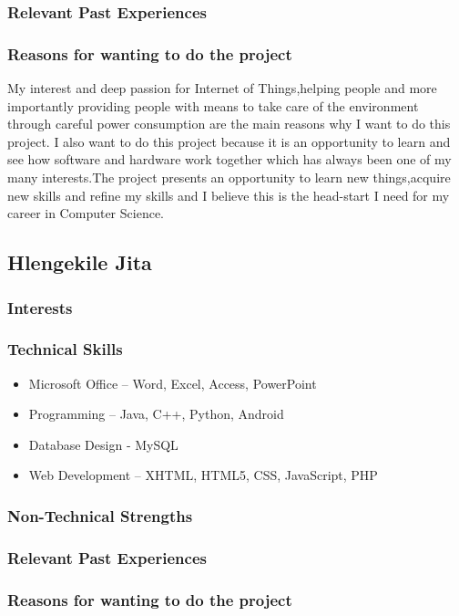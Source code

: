 \documentclass[a4paper,12pt]{article}
\begin{document}
\subsubsection{Relevant Past Experiences}
\subsubsection{Reasons for wanting to do the project}
\begin{flushleft}
My interest and deep passion for Internet of Things,helping people and more importantly providing people with means to take
care of the environment through careful power consumption are the main reasons why I want to do this project. I also want to do
this project because it is an opportunity to learn and see how software and hardware work together which has always been one of my many interests.The project presents an opportunity to learn new things,acquire new skills and refine my skills and I believe this is the head-start I need for my career in Computer Science. 
\end{flushleft}
\subsection{Hlengekile Jita}
\subsubsection{Interests}
\subsubsection{Technical Skills}
\begin{itemize}
\item Microsoft Office – Word, Excel, Access, PowerPoint
\item Programming – Java, C++, Python, Android
\item Database Design - MySQL
\item Web Development – XHTML, HTML5, CSS, JavaScript, PHP
\end{itemize}
\subsubsection{Non-Technical Strengths}
\subsubsection{Relevant Past Experiences}
\subsubsection{Reasons for wanting to do the project}
\end{document}
